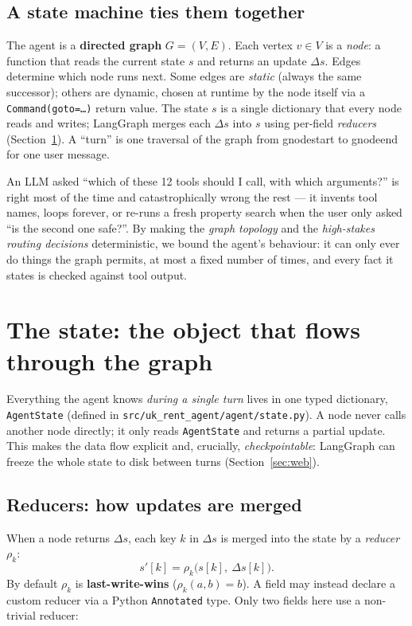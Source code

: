 \documentclass[11pt,a4paper]{article}
\newcommand{\code}[1]{\texttt{\small #1}}
\begin{document}
\subsection{A state machine ties them together}
The agent is a \textbf{directed graph} $G=(V,E)$. Each vertex $v\in V$ is a
\emph{node}: a function that reads the current state $s$ and returns an update
$\Delta s$. Edges determine which node runs next. Some edges are \emph{static}
(always the same successor); others are dynamic, chosen at runtime by the node
itself via a \code{Command(goto=\dots)} return value. The state $s$ is a single
dictionary that every node reads and writes; LangGraph merges each $\Delta s$ into
$s$ using per-field \emph{reducers} (Section~\ref{sec:state}). A ``turn'' is one
traversal of the graph from gnode{start} to gnode{end} for one user message.

\begin{keybox}
An LLM asked ``which of these 12 tools should I call, with which arguments?'' is
right most of the time and catastrophically wrong the rest --- it invents tool
names, loops forever, or re-runs a fresh property search when the user only asked
``is the second one safe?''. By making the \emph{graph topology} and the
\emph{high-stakes routing decisions} deterministic, we bound the agent's behaviour:
it can only ever do things the graph permits, at most a fixed number of times, and
every fact it states is checked against tool output.
\end{keybox}

\section{The state: the object that flows through the graph}
\label{sec:state}

Everything the agent knows \emph{during a single turn} lives in one typed
dictionary, \code{AgentState} (defined in
\code{src/uk\_rent\_agent/agent/state.py}). A node never calls another node
directly; it only reads \code{AgentState} and returns a partial update. This makes
the data flow explicit and, crucially, \emph{checkpointable}: LangGraph can freeze
the whole state to disk between turns (Section~\ref{sec:web}).

\subsection{Reducers: how updates are merged}
When a node returns $\Delta s$, each key $k$ in $\Delta s$ is merged into the state
by a \emph{reducer} $\rho_k$:
\[
  s'[k] = \rho_k\bigl(s[k],\ \Delta s[k]\bigr).
\]
By default $\rho_k$ is \textbf{last-write-wins} ($\rho_k(a,b)=b$). A field may
instead declare a custom reducer via a Python \code{Annotated} type. Only two fields
here use a non-trivial reducer:
\end{document}
